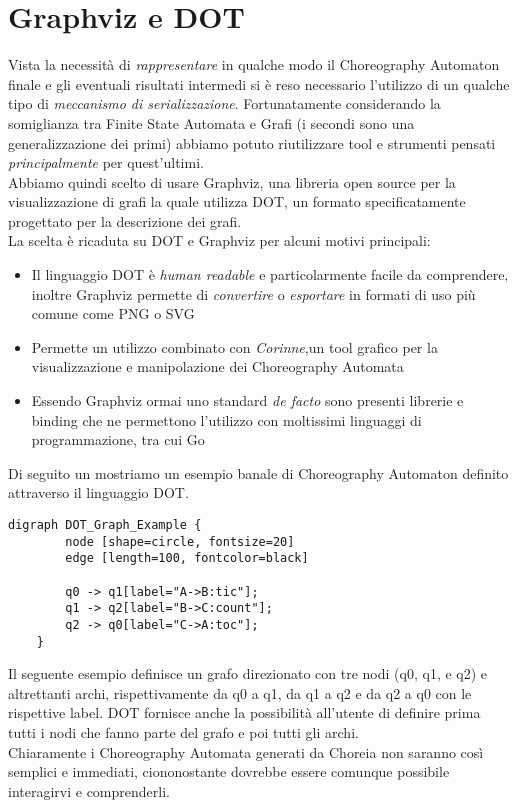 \section{Graphviz e DOT}
Vista la necessità di \emph{rappresentare} in qualche modo il Choreography Automaton finale e gli eventuali risultati intermedi si è reso necessario l'utilizzo di un qualche tipo di \emph{meccanismo di serializzazione}. Fortunatamente considerando la somiglianza tra Finite State Automata e Grafi (i secondi sono una generalizzazione dei primi) abbiamo potuto riutilizzare tool e strumenti pensati \emph{principalmente} per quest'ultimi.\\
Abbiamo quindi scelto di usare Graphviz\cite{Graphviz}, una libreria open source per la visualizzazione di grafi la quale utilizza DOT\cite{DOT_Lang}, un formato specificatamente progettato per la descrizione dei grafi.\\
La scelta è ricaduta su DOT e Graphviz per alcuni motivi principali:
\begin{itemize}
    \item Il linguaggio DOT è \emph{human readable} e particolarmente facile da comprendere, inoltre Graphviz permette di \emph{convertire} o \emph{esportare} in formati di uso più comune come PNG o SVG
    \item Permette un utilizzo combinato con \emph{Corinne}\cite{Corinne},un tool grafico per la visualizzazione e manipolazione dei Choreography Automata
    \item Essendo Graphviz ormai uno standard \emph{de facto} sono presenti librerie e binding che ne permettono l'utilizzo con moltissimi linguaggi di programmazione, tra cui Go
\end{itemize}
Di seguito un mostriamo un esempio banale di Choreography Automaton definito attraverso il linguaggio DOT.
\begin{lstlisting}[caption=Rappresentazione in DOT dell'automa in figura \ref{fig:ChoreographyAutomata_Example}]
    digraph DOT_Graph_Example {
        node [shape=circle, fontsize=20]
        edge [length=100, fontcolor=black]
      
        q0 -> q1[label="A->B:tic"];
        q1 -> q2[label="B->C:count"];
        q2 -> q0[label="C->A:toc"];
    }
\end{lstlisting}
Il seguente esempio definisce un grafo direzionato con tre nodi (q0, q1, e q2) e altrettanti archi, rispettivamente da q0 a q1, da q1 a q2 e da q2 a q0 con le rispettive label. DOT fornisce anche la possibilità all'utente di definire prima tutti i nodi che fanno parte del grafo e poi tutti gli archi.\\
Chiaramente i Choreography Automata generati da Choreia non saranno così semplici e immediati, ciononostante dovrebbe essere comunque possibile interagirvi e comprenderli.
